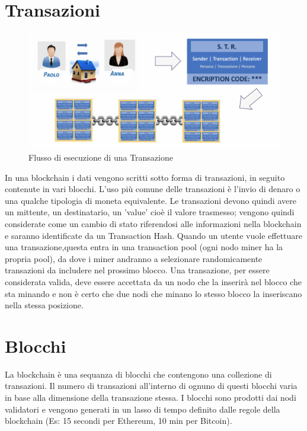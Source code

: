 \documentclass[11pt,a4paper,titlepage]{report}
\begin{document}
\section{Transazioni}

\begin{figure}[h]
	\includegraphics[width=\textwidth]{flusso_bc}
	\centering
	\caption{Flusso di esecuzione di una Transazione}
	\label{fig:fl_bc}
\end{figure}

In una blockchain i dati vengono scritti sotto forma di transazioni, in seguito contenute in vari blocchi. L'uso più comune delle transazioni è l'invio di denaro o una qualche tipologia di moneta equivalente. Le transazioni devono quindi avere un mittente, un destinatario, un 'value' cioè il valore trasmesso; vengono quindi considerate come un cambio di stato riferendosi alle informazioni nella blockchain e saranno identificate da un Transaction Hash. Quando un utente vuole effettuare una transazione,questa entra in una transaction pool (ogni nodo miner ha la propria pool), da dove i miner andranno a selezionare randomicamente transazioni da includere nel prossimo blocco. Una transazione, per essere considerata valida, deve essere accettata da un nodo che la inserirà nel blocco che sta minando e non è certo che due nodi che minano lo stesso blocco la inseriscano nella stessa posizione.

\section{Blocchi}
La blockchain è una sequanza di blocchi che contengono una collezione di transazioni. Il numero di transazioni all'interno di ognuno di questi blocchi varia in base alla dimensione della transazione stessa. I blocchi sono prodotti dai nodi validatori e vengono generati in un lasso di tempo definito dalle regole della blockchain (Es: 15 secondi per Ethereum, 10 min per Bitcoin).
\end{document}
